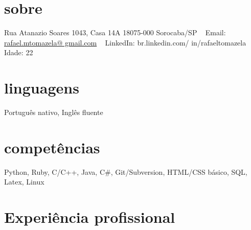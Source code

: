 \documentclass[]{friggeri-cv}
\begin{document}


\begin{aside}
  \section{sobre}
    \vspace{0.30cm}
Rua Atanazio Soares
1043, Casa 14A
18075-000
Sorocaba/SP
~
Email: \href{mailto:rafael.mtomazela
@gmail.com}{rafael.mtomazela@
gmail.com}
~
LinkedIn: br.linkedin.com/
in/rafaeltomazela
~
Idade: 22
  \section{linguagens}
    \vspace{0.30cm}
    Português nativo, 
    Inglês fluente
  \section{competências}
    \vspace{0.30cm}
    Python, Ruby,
C/C++, Java, C\#,
Git/Subversion,
HTML/CSS básico,
SQL, Latex,
Linux
\end{aside}




\section{Experiência profissional}
\end{document}
